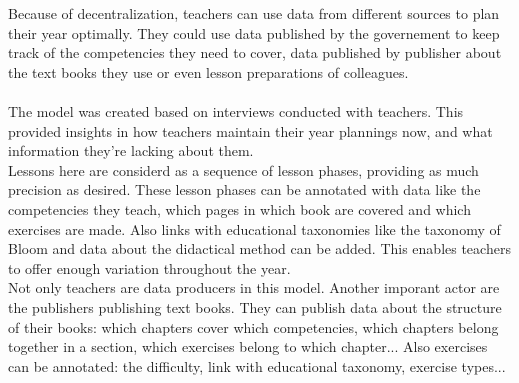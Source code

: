 Because of decentralization, teachers can use data from different sources to plan their year optimally.
They could use data published by the governement to keep track of the competencies they need to cover, data published by publisher about the text books they use or even lesson preparations of colleagues.\\ \\
The model was created based on interviews conducted with teachers. This provided insights in how teachers maintain their year plannings now, and what information they're lacking about them.\\
Lessons here are considerd as a sequence of lesson phases, providing as much precision as desired.
These lesson phases can be annotated with data like the competencies they teach, which pages in which book are covered and which exercises are made.
Also links with educational taxonomies like the taxonomy of Bloom and data about the didactical method can be added. This enables teachers to offer enough variation throughout the year.\\
Not only teachers are data producers in this model. Another imporant actor are the publishers publishing text books.
They can publish data about the structure of their books: which chapters cover which competencies, which chapters belong together in a section, which exercises belong to which chapter...
Also exercises can be annotated: the difficulty, link with educational taxonomy, exercise types...\\ \\
